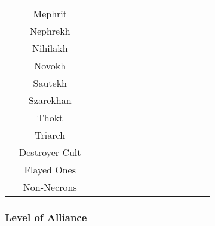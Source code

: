 \begin{tabular}{||c c c c c c c c c c c c c c c||}
	& Mephrit & \blackskull & \greyskull & & \greyskull & \greyskull  & \blackskull & \blackskull & \yellowskull & \blackskull & \blackskull & \greyskull & \redskull & \redskull \\
	& Nephrekh & \blackskull & \greyskull & \greyskull & & \blackskull & \blackskull & \blackskull & \blackskull & \blackskull & \blackskull & \greyskull & \redskull & \redskull \\
	& Nihilakh & \blackskull & \redskull & \greyskull & \blackskull & & \greyskull & \blackskull & \yellowskull & \blackskull & \blackskull & \greyskull & \redskull & \redskull \\
	& Novokh & \blackskull & \blackskull & \blackskull & \blackskull & \greyskull & & \blackskull & \blackskull & \blackskull & \yellowskull & \yellowskull & \redskull & \redskull \\
	& Sautekh & \blackskull & \greyskull & \blackskull & \blackskull & \blackskull & \blackskull & & \redskull & \greyskull & \greyskull & \greyskull & \redskull & \redskull \\
	& Szarekhan & \redskull & \blackskull & \yellowskull & \blackskull & \yellowskull & \blackskull & \redskull & & \yellowskull & \yellowskull & \greyskull & \redskull & \redskull \\
	& Thokt & \blackskull & \greyskull & \blackskull & \blackskull & \blackskull & \blackskull & \greyskull & \yellowskull & & \yellowskull & \greyskull & \redskull & \redskull \\
	& Triarch & \blackskull & \blackskull & \blackskull & \blackskull & \yellowskull & \blackskull & \greyskull & \yellowskull & \yellowskull & & \greyskull & \redskull & \redskull \\
	& Destroyer Cult & \greyskull & \blackskull & \greyskull & \greyskull & \greyskull & \yellowskull & \greyskull & \greyskull & \greyskull & \greyskull & & \greyskull & \redskull \\
	& Flayed Ones & \redskull & \blackskull & \redskull & \redskull & \redskull & \redskull & \redskull & \redskull & \redskull & \redskull & \greyskull & & \redskull \\
	& Non-Necrons & \redskull & \redskull & \redskull & \redskull & \redskull & \redskull & \redskull & \redskull & \redskull & \redskull & \redskull & \redskull & \\
	\hline
\end{tabular}

\subsubsection{Level of Alliance}

